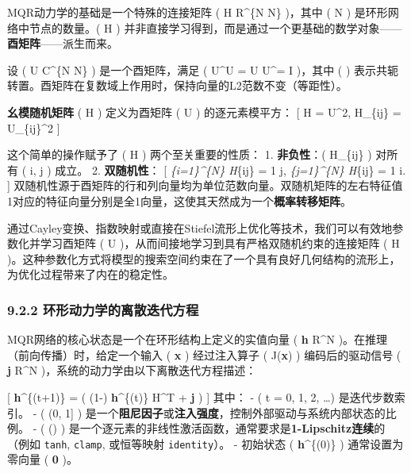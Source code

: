 \documentclass[
  12pt,
]{article}
\begin{document}
MQR动力学的基础是一个特殊的连接矩阵 ( H \in R\^{}\{N \times N\}
)，其中 ( N ) 是环形网络中节点的数量。( H )
并非直接学习得到，而是通过一个更基础的数学对象------\textbf{酉矩阵}------派生而来。

设 ( U \in C\^{}\{N \times N\} ) 是一个酉矩阵，满足 (
U\^{}\dagger U = U U\^{}\dagger = I )，其中 ( \dagger )
表示共轭转置。酉矩阵在复数域上作用时，保持向量的L2范数不变（等距性）。

\textbf{幺模随机矩阵} ( H ) 定义为酉矩阵 ( U ) 的逐元素模平方： {[} H =
\textbar U\textbar\^{}2, \quad {} \quad H\_\{ij\} =
\textbar U\_\{ij\}\textbar\^{}2 {]}

这个简单的操作赋予了 ( H ) 两个至关重要的性质： 1. \textbf{非负性}：(
H\_\{ij\}  ) 对所有 ( i, j ) 成立。 2. \textbf{双随机性}： {[}
\sum\emph{\{i=1\}\^{}\{N\} H}\{ij\} = 1 \quad \forall j, \quad {}
\quad \sum\emph{\{j=1\}\^{}\{N\} H}\{ij\} = 1 \quad \forall i. {]}
双随机性源于酉矩阵的行和列向量均为单位范数向量。双随机矩阵的左右特征值1对应的特征向量分别是全1向量，这使其天然成为一个\textbf{概率转移矩阵}。

通过Cayley变换、指数映射或直接在Stiefel流形上优化等技术，我们可以有效地参数化并学习酉矩阵
( U )，从而间接地学习到具有严格双随机约束的连接矩阵 ( H
)。这种参数化方式将模型的搜索空间约束在了一个具有良好几何结构的流形上，为优化过程带来了内在的稳定性。

\hypertarget{ux73afux5f62ux52a8ux529bux5b66ux7684ux79bbux6563ux8fedux4ee3ux65b9ux7a0b}{%
\subsubsection{9.2.2
环形动力学的离散迭代方程}\label{ux73afux5f62ux52a8ux529bux5b66ux7684ux79bbux6563ux8fedux4ee3ux65b9ux7a0b}}

MQR网络的核心状态是一个在环形结构上定义的实值向量 ( \textbf{h}
\in R\^{}N )。在推理（前向传播）时，给定一个输入 ( \textbf{x} )
经过注入算子 ( J(\textbf{x}) ) 编码后的驱动信号 ( \textbf{j}
\in R\^{}N )，系统的动力学由以下离散迭代方程描述：

{[} \textbf{h}\^{}\{(t+1)\} = \sigma\left( (1-\alpha)
\textbf{h}\^{}\{(t)\} H\^{}T + \alpha \textbf{j} \right) {]} 其中： - (
t = 0, 1, 2, \dots ) 是迭代步数索引。 - ( \alpha \in (0, 1{]} )
是一个\textbf{阻尼因子}或\textbf{注入强度}，控制外部驱动与系统内部状态的比例。
- ( \sigma(\cdot) )
是一个逐元素的非线性激活函数，通常要求是\textbf{1-Lipschitz连续}的（例如
\texttt{tanh}, \texttt{clamp}, 或恒等映射 \texttt{identity}）。 -
初始状态 ( \textbf{h}\^{}\{(0)\} ) 通常设置为零向量 ( \textbf{0} )。
\end{document}
